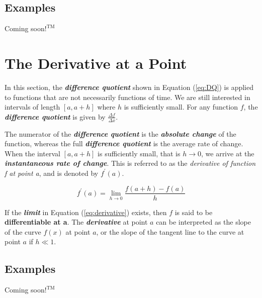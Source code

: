 \begin{center}
\section*{\small Examples}
Coming soon$!^{\text{TM}}$
\end{center}

\section{The Derivative at a Point}
In this section, the \textbf{\textit{difference quotient}} shown in Equation (\ref{eq:DQ}) is applied to functions that are not necessarily functions of time. We are still interested in intervals of length $[a, a+h]$ where $h$ is sufficiently small. For any function $f$, the \textbf{\textit{difference quotient}} is given by $\frac{\Delta f}{\Delta x}$.

\vspace{0.1in}
The numerator of the \textbf{\textit{difference quotient}} is the \textbf{\textit{absolute change}} of the function, whereas the full \textbf{\textit{difference quotient}} is the average rate of change. When the interval $[a, a+h]$ is sufficiently small, that is $h \rightarrow 0$, we arrive at the \textbf{\textit{instantaneous rate of change}}. This is referred to as the \textit{derivative of function f at point a}, and is denoted by $f^\prime(a)$.

\begin{equation}
\label{eq:derivative}
f^\prime(a) = \lim_{h\rightarrow 0} \frac{f(a+h) - f(a)}{h}
\end{equation}

If the \textbf{\textit{limit}} in Equation (\ref{eq:derivative}) exists, then $f$ is said to be \textbf{differentiable at a}. The \textbf{\textit{derivative}} at point $a$ can be interpreted as the slope of the curve $f(x)$ at point $a$, or the slope of the tangent line to the curve at point $a$ if $h \ll 1$.

\begin{center}
\section*{\small Examples}
Coming soon$!^{\text{TM}}$
\end{center}

